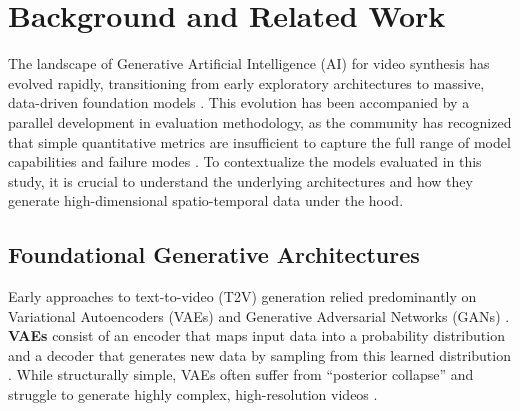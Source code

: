\documentclass[sigconf]{acmart}
\begin{document}

\section{Background and Related Work}
\label{sec:background}

The landscape of Generative Artificial Intelligence (AI) for video synthesis
has evolved rapidly, transitioning from early exploratory architectures to
massive, data-driven foundation models \cite{kaswan2023generative,
    xie2025comprehensive}. This evolution has been accompanied by a parallel
development in evaluation methodology, as the community has recognized that
simple quantitative metrics are insufficient to capture the full range of
model capabilities and failure modes \cite{huang2024vbench,
    liu2024evalcrafter}. To contextualize the models evaluated in this study,
it is crucial to understand the underlying architectures and how they
generate high-dimensional spatio-temporal data under the hood.

\subsection{Foundational Generative Architectures}
Early approaches to text-to-video (T2V) generation relied predominantly on
Variational Autoencoders (VAEs) and Generative Adversarial Networks (GANs)
\cite{kaswan2023generative, xie2025comprehensive}.
\textbf{VAEs} consist of an encoder that maps input data into a probability
distribution and a decoder that generates new data by sampling from this
learned distribution \cite{xie2025comprehensive}. While structurally simple,
VAEs often suffer from ``posterior collapse'' and struggle to generate highly
complex, high-resolution videos \cite{xie2025comprehensive}.
\end{document}
